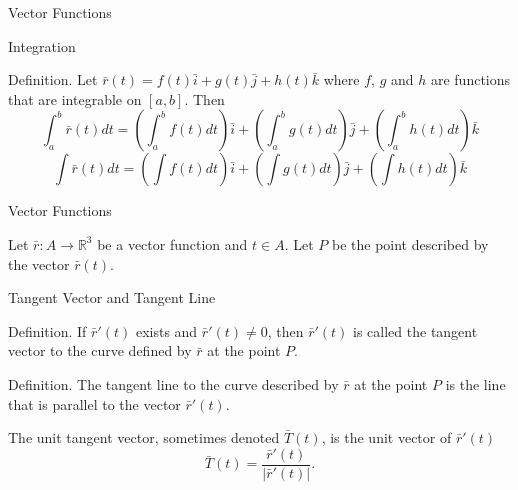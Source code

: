 \documentclass[aspectratio=169, UTF8]{ctexbeamer}
\begin{document}
    \begin{frame}[t]{Vector Functions}
        \begin{block}{Integration}
            \par \textcolor{yy}{Definition.} Let $\bar{r}(t) = f(t) \bar{i} + g(t) \bar{j} + h(t) \bar{k}$ where $f$, $g$ and $h$ are functions that are integrable on $[a,b]$. Then
            \begin{equation*}
                \int_{a}^{b} \bar{r}(t) d t=\left(\int_{a}^{b} f(t) d t\right) \bar{i}+\left(\int_{a}^{b} g(t) d t\right) \bar{j}+\left(\int_{a}^{b} h(t) d t\right) \bar{k}
            \end{equation*}
            \begin{equation*}
                \int \bar{r}(t) d t=\left(\int f(t) d t\right) \bar{i}+\left(\int g(t) d t\right) \bar{j}+\left(\int h(t) d t\right) \bar{k}
            \end{equation*}
        \end{block}
    \end{frame}

    \begin{frame}[t]{Vector Functions}
        \par Let $\bar{r}: A \to \mathbb{R}^3$ be a vector function and $t \in A$. Let $P$ be the point described by the vector $\bar{r}(t)$.
        \begin{block}{Tangent Vector and Tangent Line}
            \par \textcolor{yy}{Definition.} If $\bar{r}'(t)$ exists and $\bar{r}'(t) \neq 0$, then $\bar{r}'(t)$ is called the \textcolor{yy}{tangent vector} to the curve defined by $\bar{r}$ at the point $P$.

            \phantom{zjy}
            
            \par \textcolor{yy}{Definition.} The \textcolor{yy}{tangent line} to the curve described by $\bar{r}$ at the point $P$ is the line that is parallel to the vector $\bar{r}'(t)$.
        \end{block}

        \par The \textcolor{yy}{unit tangent vector}, sometimes denoted $\bar{T}(t)$, is the unit vector of $\bar{r}'(t)$
        \begin{equation*}
            \bar{T} (t) = \dfrac{\bar{r}'(t)}{|\bar{r}'(t)|} .
        \end{equation*}
    \end{frame}
\end{document}
